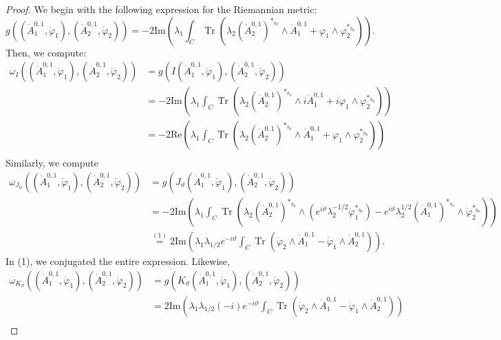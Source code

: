 \documentclass[12pt,letterpaper,reqno]{amsart}
\theoremstyle{remark}
\theoremstyle{definition}
\numberwithin{thm}{section}
\numberwithin{equation}{section}
\numberwithin{figure}{section}
\DeclareMathOperator{\Tr}{Tr}
\begin{document}
\begin{proof} 
We begin with the following expression for the Riemannian metric:
\begin{equation*} 
 g \left((\dot{A}^{0,1}_1, \dot{\varphi}_1), (\dot{A}^{0,1}_2, \dot{\varphi}_2)\right)
=-2 \mathrm{Im}  \left( \lambda_1 \int_C \Tr  \left( \lambda_2 (\dot{A}^{0,1}_{2} )^{*_{h_0}} \wedge \dot{A}^{0,1}_{1}   + \varphi_{1} \wedge \varphi_{2}^{*_{h_0}}  \right) \right).
\end{equation*}
Then, we compute: 
\begin{align*}
\omega_I\left((\dot{A}^{0,1}_1, \dot{\varphi}_1), (\dot{A}^{0,1}_2, \dot{\varphi}_2)\right)&= g \left(I (\dot{A}^{0,1}_1, \dot{\varphi}_1), (\dot{A}^{0,1}_2, \dot{\varphi}_2)\right)\\
&=
-2 \mathrm{Im}  \left( \lambda_1 \int_C \Tr  \left( \lambda_2 (\dot{A}^{0,1}_{2} )^{*_{h_0}} \wedge i\dot{A}^{0,1}_{1}   +i\varphi_{1} \wedge \varphi_{2}^{*_{h_0}}  \right) \right)\\
&=-2 \mathrm{Re}  \left( \lambda_1 \int_C \Tr  \left( \lambda_2 (\dot{A}^{0,1}_{2} )^{*_{h_0}} \wedge \dot{A}^{0,1}_{1}   +\varphi_{1} \wedge \varphi_{2}^{*_{h_0}}  \right) \right)\\
\end{align*}
Similarly, we compute
\begin{align*}
\omega_{J_\vartheta} \left((\dot{A}^{0,1}_1, \dot{\varphi}_1), (\dot{A}^{0,1}_2, \dot{\varphi}_2)\right)
&= g \left(J_{\vartheta} (\dot{A}^{0,1}_1, \dot{\varphi}_1), (\dot{A}^{0,1}_2, \dot{\varphi}_2)\right)\\
&=-2 \mathrm{Im}  \left( \lambda_1 \int_C \Tr  \left( \lambda_2 (\dot{A}^{0,1}_{2} )^{*_{h_0}} \wedge (e^{i \vartheta} \lambda_2^{-1/2} \dot{\varphi}_1^{*_{h_0}})  - e^{i \vartheta} \lambda_2^{1/2}(\dot{A}_1^{0,1})^{*_{h_0}} \wedge \dot \varphi_{2}^{*_{h_0}}  \right) \right)\\
&\overset{(1)}{=}2 \mathrm{Im}  \left( \lambda_1 \lambda_{1/2} e^{-i \vartheta} \int_C \Tr  \left(\dot\varphi_{2} \wedge \dot{A}_1^{0,1}   - \dot{\varphi}_1  \wedge \dot{A}^{0,1}_{2}   \right) \right).
\end{align*}
In (1), we conjugated the entire expression.
Likewise,
\begin{align*}
\omega_{K_\vartheta} \left((\dot{A}^{0,1}_1, \dot{\varphi}_1), (\dot{A}^{0,1}_2, \dot{\varphi}_2)\right)
&= g \left(K_{\vartheta} (\dot{A}^{0,1}_1, \dot{\varphi}_1), (\dot{A}^{0,1}_2, \dot{\varphi}_2)\right)\\
&=2 \mathrm{Im}  \left( \lambda_1 \lambda_{1/2} (-i)e^{-i \vartheta} \int_C \Tr  \left(\dot\varphi_{2} \wedge \dot{A}_1^{0,1}   - \dot{\varphi}_1  \wedge \dot{A}^{0,1}_{2}   \right) \right)\\

\end{align*}
\end{proof}
\end{document}
